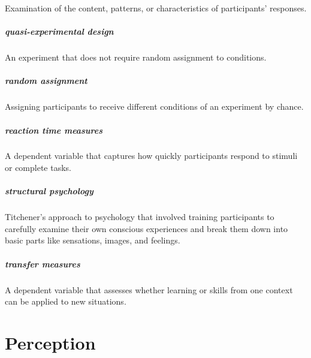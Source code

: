 \documentclass[
]{krantz}
\begin{document}
Examination of the content, patterns, or characteristics of participants' responses.

\paragraph*{quasi-experimental design}\label{quasi-experimental-design}

An experiment that does not require random assignment to conditions.

\paragraph*{random assignment}\label{random-assignment}

Assigning participants to receive different conditions of an experiment by chance.

\paragraph*{reaction time measures}\label{reaction-time-measures}

A dependent variable that captures how quickly participants respond to stimuli or complete tasks.

\paragraph*{structural psychology}\label{structural-psychology}

Titchener's approach to psychology that involved training participants to carefully examine their own conscious experiences and break them down into basic parts like sensations, images, and feelings.

\paragraph*{transfer measures}\label{transfer-measures}

A dependent variable that assesses whether learning or skills from one context can be applied to new situations.

\chapter{Perception}\label{perception}
\end{document}
